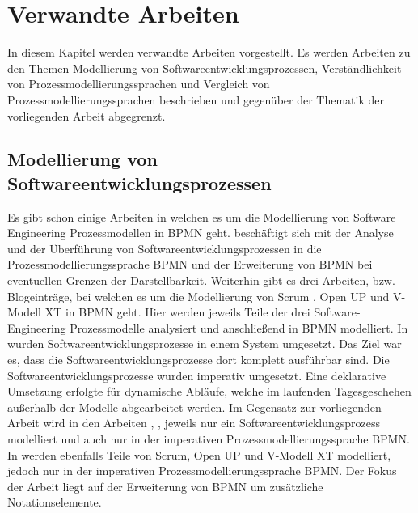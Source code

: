 \chapter{Verwandte Arbeiten}\label{sec:chapter9}

In diesem Kapitel werden verwandte Arbeiten vorgestellt. Es werden Arbeiten zu den Themen Modellierung von Softwareentwicklungsprozessen, Verständlichkeit von Prozessmodellierungssprachen und Vergleich von Prozessmodellierungssprachen beschrieben und gegenüber der Thematik der vorliegenden Arbeit abgegrenzt.

\section{Modellierung von Softwareentwicklungsprozessen}

Es gibt schon einige Arbeiten in welchen es um die Modellierung von Software Engineering Prozessmodellen in BPMN geht.
\cite{Menhorn2014} beschäftigt sich mit der Analyse und der Überführung von Softwareentwicklungsprozessen in die Prozessmodellierungssprache BPMN und der Erweiterung von BPMN bei eventuellen Grenzen der Darstellbarkeit.\newline
Weiterhin gibt es drei Arbeiten, bzw. Blogeinträge, bei welchen es um die Modellierung von Scrum \cite{software}, Open UP \cite{brunner2007fallstudie} und V-Modell XT \cite{Bregenzer2014} in BPMN geht. Hier werden jeweils Teile der drei Software-Engineering Prozessmodelle analysiert und anschließend in BPMN modelliert.\newline
In \cite{sabrina734, sabrina758, sabrina795} wurden Softwareentwicklungsprozesse in einem System umgesetzt. Das Ziel war es, dass die Softwareentwicklungsprozesse dort komplett ausführbar sind. Die Softwareentwicklungsprozesse wurden imperativ umgesetzt. Eine deklarative Umsetzung erfolgte für dynamische Abläufe, welche im laufenden Tagesgeschehen außerhalb der Modelle abgearbeitet werden.\newline
 Im Gegensatz zur vorliegenden Arbeit wird in den Arbeiten \cite{software}, \cite{brunner2007fallstudie}, \cite{Bregenzer2014} jeweils nur ein Softwareentwicklungsprozess modelliert und auch nur in der imperativen Prozessmodellierungssprache BPMN. In \cite{Menhorn2014} werden ebenfalls Teile von Scrum, Open UP und V-Modell XT modelliert, jedoch nur in der imperativen Prozessmodellierungssprache BPMN. Der Fokus der Arbeit \cite{Menhorn2014} liegt auf der Erweiterung von BPMN um zusätzliche Notationselemente.\newline
